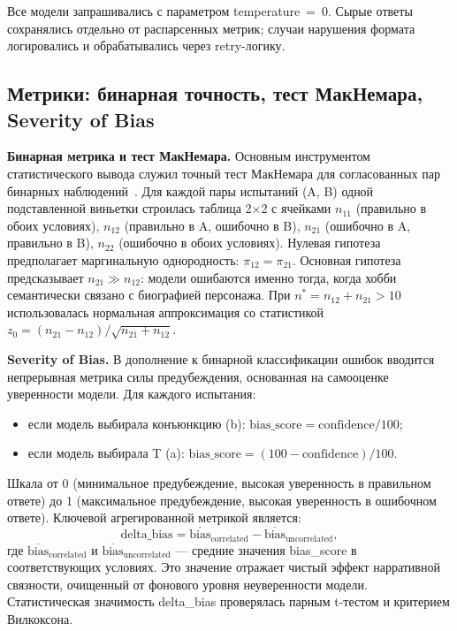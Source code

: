 Все модели запрашивались с параметром temperature~=~0. Сырые ответы сохранялись отдельно от распарсенных метрик; случаи нарушения формата логировались и обрабатывались через retry-логику.

\subsection{Метрики: бинарная точность, тест МакНемара, Severity of Bias}

\textbf{Бинарная метрика и тест МакНемара.} Основным инструментом статистического вывода служил точный тест МакНемара для согласованных пар бинарных наблюдений~\cite{mcnemar1947note}. Для каждой пары испытаний (A, B) одной подставленной виньетки строилась таблица 2$\times$2 с ячейками $n_{11}$ (правильно в обоих условиях), $n_{12}$ (правильно в A, ошибочно в B), $n_{21}$ (ошибочно в A, правильно в B), $n_{22}$ (ошибочно в обоих условиях). Нулевая гипотеза предполагает маргинальную однородность: $\pi_{12} = \pi_{21}$. Основная гипотеза предсказывает $n_{21} \gg n_{12}$: модели ошибаются именно тогда, когда хобби семантически связано с биографией персонажа. При $n^* = n_{12} + n_{21} > 10$ использовалась нормальная аппроксимация со статистикой $z_0 = (n_{21} - n_{12}) / \sqrt{n_{21} + n_{12}}$.

\textbf{Severity of Bias.} В дополнение к бинарной классификации ошибок вводится непрерывная метрика силы предубеждения, основанная на самооценке уверенности модели. Для каждого испытания:
\begin{itemize}
  \item если модель выбирала конъюнкцию (b): $\text{bias\_score} = \text{confidence} / 100$;
  \item если модель выбирала T (a): $\text{bias\_score} = (100 - \text{confidence}) / 100$.
\end{itemize}

Шкала от 0 (минимальное предубеждение, высокая уверенность в правильном ответе) до 1 (максимальное предубеждение, высокая уверенность в ошибочном ответе). Ключевой агрегированной метрикой является:
\begin{equation}
  \text{delta\_bias} = \overline{\text{bias}}_{\text{correlated}} - \overline{\text{bias}}_{\text{uncorrelated}},
  \label{eq:delta_bias}
\end{equation}
где $\overline{\text{bias}}_{\text{correlated}}$ и $\overline{\text{bias}}_{\text{uncorrelated}}$ --- средние значения bias\_score в соответствующих условиях. Это значение отражает чистый эффект нарративной связности, очищенный от фонового уровня неуверенности модели. Статистическая значимость delta\_bias проверялась парным t-тестом и критерием Вилкоксона.

